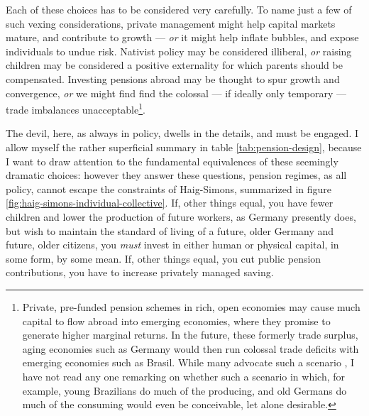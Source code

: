 \documentclass[11pt,a4paper,oneside,openright]{article}
\begin{document}

Each of these choices has to be considered very carefully. 
To name just a few of such vexing considerations, private management might help capital markets mature, and contribute to growth \citep[155]{Barr2005a} --- \emph{or} it might help inflate bubbles, and expose individuals to undue risk. 
Nativist policy may be considered illiberal, \emph{or} raising children may be considered a positive externality for which parents should be compensated. 
Investing pensions abroad may be thought to spur growth and convergence, \emph{or} we might find find the colossal --- if ideally only temporary --- trade imbalances unacceptable\footnote{
	Private, pre-funded pension schemes in rich, open economies may cause much capital to flow abroad into emerging economies, where they promise to generate higher marginal returns. 
	In the future, these formerly trade surplus, aging economies such as Germany would then run colossal trade deficits with emerging economies such as Brasil. 
	While many advocate such a scenario \citep[e.g.][176]{Borsch-Supan2003}, I have not read any one remarking on whether such a scenario in which, for example, young Brazilians do much of the producing, and old Germans do much of the consuming would even be conceivable, let alone desirable.
}.

The devil, here, as always in policy, dwells in the details, and must be engaged. 
I allow myself the rather superficial summary in table \ref{tab:pension-design}, because I want to draw attention to the fundamental equivalences of these seemingly dramatic choices: 
however they answer these questions, pension regimes, as all policy, cannot escape the constraints of Haig-Simons, summarized in figure \ref{fig:haig-simons-individual-collective}. 
If, other things equal, you have fewer children and lower the production of future workers, as Germany presently does, but wish to maintain the standard of living of a future, older Germany and future, older citizens, you \emph{must} invest in either human or physical capital, in some form, by some mean. 
If,  other things equal, you cut public pension contributions, you have to increase privately managed saving.
\end{document}

